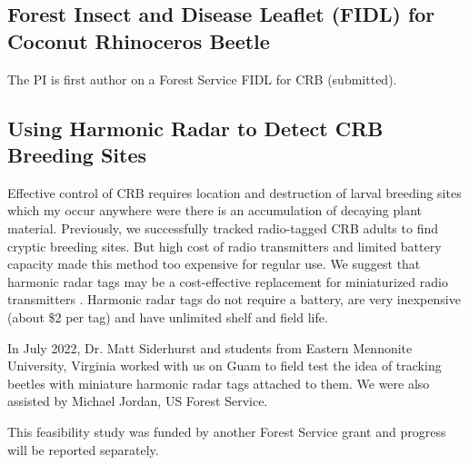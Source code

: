 \documentclass[12pt,letterpaper,english,bibliography=totocnumbered, abstract=on]{scrartcl}
\begin{document}
\subsection{Forest Insect and Disease Leaflet (FIDL) for Coconut Rhinoceros Beetle}

The PI is first author on a Forest Service FIDL for CRB (submitted). 

\subsection{Using Harmonic Radar to Detect CRB Breeding Sites}

Effective control of CRB requires location and destruction of larval breeding sites which my occur anywhere were there is an accumulation of decaying plant material. Previously, we successfully tracked radio-tagged CRB adults to find cryptic breeding sites. But high cost of radio transmitters and limited battery capacity made this method too expensive for regular use. We suggest that harmonic radar tags may be a cost-effective replacement for miniaturized radio transmitters \cite{mooreProposalDetectingCoconut2022}. Harmonic radar tags do not require a battery, are very inexpensive (about \$2 per tag) and have unlimited shelf and field life.

In July 2022, Dr. Matt Siderhurst and students from Eastern Mennonite University, Virginia worked with us on Guam to field test the idea of tracking beetles with miniature harmonic radar tags attached to them. We were also assisted by Michael Jordan, US Forest Service.

This feasibility study was funded by another Forest Service grant and progress will be reported separately.

\newpage

\printbibliography
\end{document}

